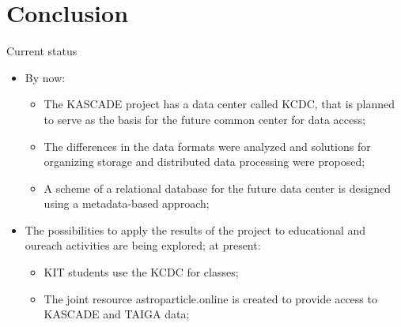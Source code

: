 \section{Conclusion}

\begin{frame}{Current status}
\begin{itemize}
  \item By now:
  \begin{itemize}
    \item The KASCADE project has a data center called KCDC, that is planned to serve as the basis for the future common center for data access;
    \item The differences in the data formats were analyzed and solutions for organizing storage and distributed data processing were proposed;
    \item A scheme of a relational database for the future data center is designed using a metadata-based approach;
  \end{itemize}
  \item The possibilities to apply the results of the project to educational and oureach activities are being explored; at present:
  \begin{itemize}
    \item KIT students use the KCDC for classes;
    \item The joint resource astroparticle.online is created to provide access to KASCADE and TAIGA data;
  \end{itemize}
\end{itemize}
\end{frame}

